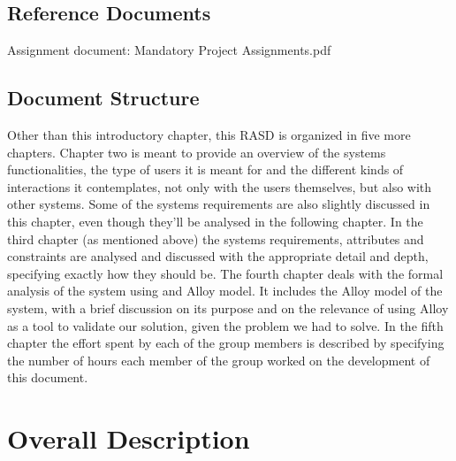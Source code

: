 \documentclass[12pt]{article}
\begin{document}
\subsection{Reference Documents}
Assignment document: Mandatory Project Assignments.pdf

\subsection{Document Structure}
Other than this introductory chapter, this RASD is organized in five more chapters. Chapter two is meant to provide an overview of the systems functionalities, the type of users it is meant for and the different kinds of interactions it contemplates, not only with the users themselves, but also with other systems. Some of the systems requirements are also slightly discussed in this chapter, even though they’ll be analysed in the following chapter. In the third chapter (as mentioned above) the systems requirements, attributes and constraints are analysed and discussed with the appropriate detail and depth, specifying exactly how they should be.
The fourth chapter deals with the formal analysis of the system using and Alloy model. It includes the Alloy model of the system, with a brief discussion on its purpose and on the relevance of using Alloy as a tool to validate our solution, given the problem we had to solve.
In the fifth chapter the effort spent by each of the group members is described by specifying the number of hours each member of the group worked on the development of this document.

\section{Overall Description}
\end{document}
